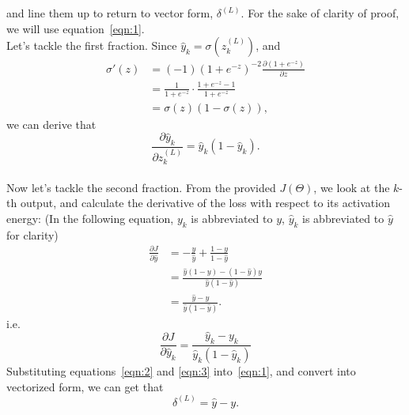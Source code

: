 \documentclass[11pt]{report}
\theoremstyle{definition}
\begin{document}
and line them up to return to vector form, $\delta^{(L)}$.
For the sake of clarity of proof, we will use equation~\eqref{eqn:1}.
\bigskip
\\ Let's tackle the first fraction.
Since $\hat{y}_k = \sigma(z^{(L)}_k)$, and
\begin{align*}
    \sigma'(z)
    &= (-1)(1 + e^{-z})^{-2}\frac{\partial (1 + e^{-z})}{\partial z}\\
    &= \frac{1}{1 + e^{-z}} \cdot \frac{1 + e^{-z} - 1}{1 + e^{-z}} \\
    &= \sigma(z)(1 - \sigma(z)),
\end{align*} 
we can derive that
\begin{equation}\label{eqn:2}
    \frac{\partial \hat{y}_k}{\partial z^{(L)}_k} = \hat{y}_k(1 - \hat{y}_k).
\end{equation} 
\medskip
\\Now let's tackle the second fraction. 
From the provided $J(\Theta)$,
we look at the $k$-th output,
and calculate the derivative of the loss with respect to its activation energy:
(In the following equation, $y_k$ is abbreviated to $y$, 
$\hat{y}_k$ is abbreviated to $\hat{y}$ for clarity)
\begin{align*}
    \frac{\partial J}{\partial \hat{y}}
    &= -\frac{y}{\hat{y}} + \frac{1 - y}{1 - \hat{y}} \\
    &= \frac{\hat{y}(1 - y) - (1 - \hat{y})y}{\hat{y}(1 - \hat{y})} \\
    &= \frac{\hat{y} - y}{\hat{y}(1 - \hat{y})}.
\end{align*} 
i.e.
\begin{equation}\label{eqn:3}
    \frac{\partial J}{\partial \hat{y}_k} 
    = \frac{\hat{y}_k - y_k}{\hat{y}_k(1 - \hat{y}_k)}
\end{equation} 
Substituting equations~\eqref{eqn:2} and \eqref{eqn:3} into~\eqref{eqn:1},
and convert into vectorized form, we can get that\[
    \delta^{(L)} = \hat{y} - y.
\]
\end{document}
